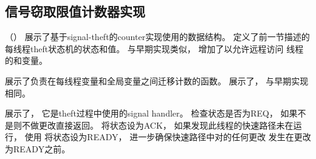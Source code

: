\subsection{信号窃取限值计数器实现}
\label{sec:count:Signal-Theft Limit Counter Implementation}

\begin{fcvref}
（）
展示了基于signal-theft的counter实现使用的数据结构。
定义了前一节描述的
每线程theft状态机的状态和值。
与早期实现类似，
增加了以允许远程访问
线程的和变量。
\end{fcvref}

\begin{listing}
\caption{Signal-Theft Limit Counter数据}
\label{lst:count:Signal-Theft Limit Counter Data}
\end{listing}

\begin{fcvref}
展示了负责在每线程变量和全局变量之间迁移计数的函数。
展示了，
与早期实现相同。
\end{fcvref}
\begin{fcvref}
展示了，
它是theft过程中使用的signal handler。
检查状态是否为REQ，
如果不是则不做更改直接返回。
将状态设为ACK，
如果发现此线程的快速路径未在运行，
使用
将状态设为READY，
进一步确保快速路径中对的任何更改
发生在更改为READY之前。
\end{fcvref}

\begin{listing}
\caption{Signal-Theft Limit Counter值迁移函数}
\label{lst:count:Signal-Theft Limit Counter Value-Migration Functions}
\end{listing}

\QuickQuizEnd

